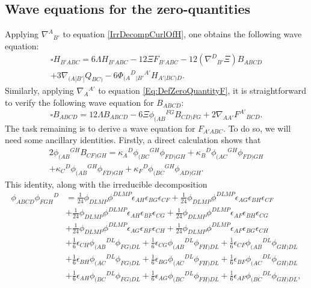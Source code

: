 \documentclass[10pt,a4paper]{article}
\theoremstyle{plain}
\begin{document}

\subsection{Wave equations for the zero-quantities}
\label{Sec:KSWaveEqs}

Applying $\nabla^A{}_{B'}$ to equation \eqref{IrrDecompCurlOfH}, one
obtains the following wave equation:
\begin{multline}
    \square H_{B'ABC} = 6 \Lambda H_{B'ABC} - 12 \Xi F_{B'ABC} -
    12(\nabla^{D}{}_{B'}\Xi) B_{ABCD} \\+ 3\nabla_{(A|B'|}Q_{BC)} - 6
    \Phi_{(A}{}^{D}{}_{|B'}{}^{A'}H_{A'|BC)D}. \label{Eq:WaveEqForH}
\end{multline}
Similarly, applying $\nabla_A{}^{A'}$ to equation
\eqref{Eq:DefZeroQuantityF}, it is straightforward to verify the
following wave equation for $B_{ABCD}$:
\begin{equation}
     \square B_{ABCD} = 12\Lambda B_{ABCD} - 6\Xi
     \phi_{(AB}{}^{FG}B_{CD)FG} +
     2\nabla_{AA'}F^{A'}{}_{BCD}. \label{Eq:FirstWaveEqForB}
\end{equation}
The task remaining is to derive a wave equation for $F_{A'ABC}$.  To
do so, we will need some ancillary identities. Firstly, a direct
calculation shows that
\begin{multline}
2\phi_{(AB}{}^{GH}B_{CF)GH}=
\kappa_A{}^D\phi_{(BC}{}^{GH}\phi_{FD)GH}+\kappa_B{}^D\phi_{(AC}{}^{GH}\phi_{FD)GH}
\\+\kappa_C{}^D\phi_{(AB}{}^{GH}\phi_{FD)GH}+\kappa_F{}^D\phi_{(BC}{}^{GH}\phi_{AD)GH}.
\label{Eq:UsefulIdentity1}
 \end{multline}
This identity, along with the irreducible decomposition
\begin{align*}
\phi_{ABCD} \phi_{FGH}{}^{D} &= \tfrac{1}{24} \phi_{DLMP} \phi^{DLMP}
\epsilon_{AH} \epsilon_{BG} \epsilon_{CF} + \tfrac{1}{24} \phi_{DLMP}
\phi^{DLMP} \epsilon_{AG} \epsilon_{BH} \epsilon_{CF} \\ & +
\tfrac{1}{24} \phi_{DLMP} \phi^{DLMP} \epsilon_{AH} \epsilon_{BF}
\epsilon_{CG} + \tfrac{1}{24} \phi_{DLMP} \phi^{DLMP} \epsilon_{AF}
\epsilon_{BH} \epsilon_{CG} \\ &+ \tfrac{1}{24} \phi_{DLMP}
\phi^{DLMP} \epsilon_{AG} \epsilon_{BF} \epsilon_{CH} + \tfrac{1}{24}
\phi_{DLMP} \phi^{DLMP} \epsilon_{AF} \epsilon_{BG} \epsilon_{CH}
\\ &+ \tfrac{1}{6} \epsilon_{CH} \phi_{(AB}{}^{DL}\phi_{FG)DL} +
\tfrac{1}{6} \epsilon_{CG} \phi_{(AB}{}^{DL}\phi_{FH)DL} +
\tfrac{1}{6} \epsilon_{CF} \phi_{(AB}{}^{DL}\phi_{GH)DL}\\ & +
\tfrac{1}{6} \epsilon_{BH} \phi_{(AC}{}^{DL}\phi_{FG)DL} +
\tfrac{1}{6} \epsilon_{BG} \phi_{(AC}{}^{DL}\phi_{FH)DL} +
\tfrac{1}{6} \epsilon_{BF} \phi_{(AC}{}^{DL}\phi_{GH)DL}\\ &+
\tfrac{1}{6} \epsilon_{AH} \phi_{(BC}{}^{DL}\phi_{FG)DL} +
\tfrac{1}{6} \epsilon_{AG} \phi_{(BC}{}^{DL}\phi_{FH)DL} +
\tfrac{1}{6} \epsilon_{AF} \phi_{(BC}{}^{DL}\phi_{GH)DL},
\end{align*}
\end{document}
